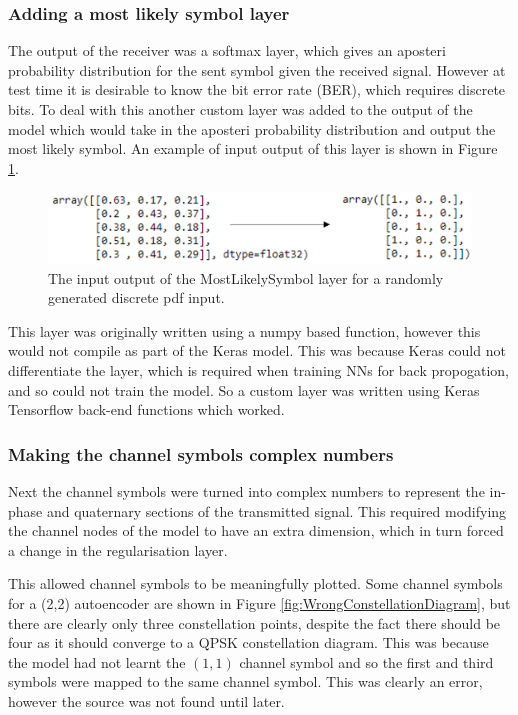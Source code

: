 \documentclass[12pt,onecolumn,letterpaper]{article}
\begin{document}
\subsubsection{Adding a most likely symbol layer}

The output of the receiver was a softmax layer, which gives an aposteri probability distribution for the sent symbol given the received signal. However at test time it is desirable to know the bit error rate (BER), which requires discrete bits. To deal with this another custom layer was added to the output of the model which would take in the aposteri probability distribution and output the most likely symbol. An example of input output of this layer is shown in Figure \ref{fig:MostLikelySymbolLayer}.

\begin{figure}[t]
   \centering
   \includegraphics[width=0.8\linewidth]{figures/most_likely_symbol_io.PNG}
   \caption{The input output of the MostLikelySymbol layer for a randomly generated discrete pdf input. }
\label{fig:MostLikelySymbolLayer}
\end{figure}

This layer was originally written using a numpy based function, however this would not compile as part of the Keras model. This was because Keras could not differentiate the layer, which is required when training NNs for back propogation, and so could not train the model. So a custom layer was written using Keras Tensorflow back-end functions which worked.

\subsubsection{Making the channel symbols complex numbers}

Next the channel symbols were turned into complex numbers to represent the in-phase and quaternary sections of the transmitted signal. This required modifying the channel nodes of the model to have an extra dimension, which in turn forced a change in the regularisation layer.

This allowed channel symbols to be meaningfully plotted. Some channel symbols for a (2,2) autoencoder are shown in Figure \ref{fig:WrongConstellationDiagram}, but there are clearly only three constellation points, despite the fact there should be four as it should converge to a QPSK constellation diagram. This was because the model had not learnt the $(1,1)$ channel symbol and so the first and third symbols were mapped to the same channel symbol. This was clearly an error, however the source was not found until later. 
\end{document}

